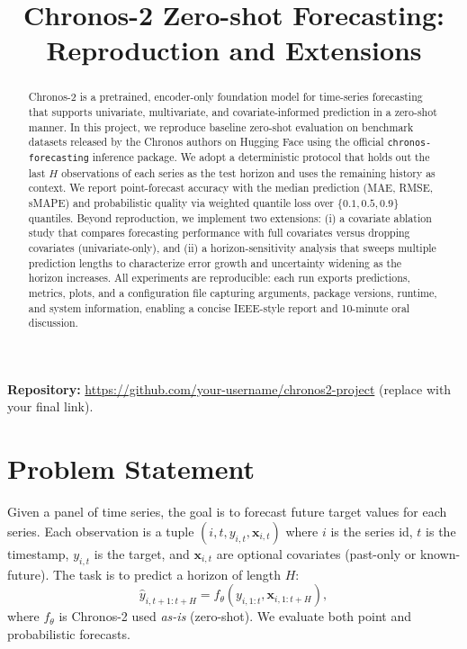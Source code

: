 \documentclass[conference]{IEEEtran}
\title{Chronos-2 Zero-shot Forecasting: Reproduction and Extensions}
\author{
\IEEEauthorblockN{Your Name}
\IEEEauthorblockA{Master's Degree in \\
University Name \\
Email: you@example.com}
}
\begin{document}
\maketitle

\begin{abstract}
Chronos-2 is a pretrained, encoder-only foundation model for time-series forecasting that supports univariate, multivariate, and covariate-informed prediction in a zero-shot manner. In this project, we reproduce baseline zero-shot evaluation on benchmark datasets released by the Chronos authors on Hugging Face using the official \texttt{chronos-forecasting} inference package. We adopt a deterministic protocol that holds out the last $H$ observations of each series as the test horizon and uses the remaining history as context. We report point-forecast accuracy with the median prediction (MAE, RMSE, sMAPE) and probabilistic quality via weighted quantile loss over $\{0.1,0.5,0.9\}$ quantiles. Beyond reproduction, we implement two extensions: (i) a covariate ablation study that compares forecasting performance with full covariates versus dropping covariates (univariate-only), and (ii) a horizon-sensitivity analysis that sweeps multiple prediction lengths to characterize error growth and uncertainty widening as the horizon increases. All experiments are reproducible: each run exports predictions, metrics, plots, and a configuration file capturing arguments, package versions, runtime, and system information, enabling a concise IEEE-style report and 10-minute oral discussion.
\end{abstract}

\textbf{Repository:} \url{https://github.com/your-username/chronos2-project} (replace with your final link).

\section{Problem Statement}
Given a panel of time series, the goal is to forecast future target values for each series. Each observation is a tuple $(i, t, y_{i,t}, \mathbf{x}_{i,t})$ where $i$ is the series id, $t$ is the timestamp, $y_{i,t}$ is the target, and $\mathbf{x}_{i,t}$ are optional covariates (past-only or known-future). The task is to predict a horizon of length $H$:
\begin{equation}
\hat{y}_{i,t+1:t+H} = f_\theta(y_{i,1:t}, \mathbf{x}_{i,1:t+H}),
\end{equation}
where $f_\theta$ is Chronos-2 used \emph{as-is} (zero-shot). We evaluate both point and probabilistic forecasts.
\end{document}
